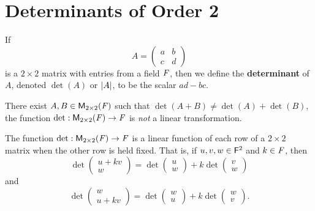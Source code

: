 \section{Determinants of Order \textrm{2}}\label{sec:4.1}

\begin{defn}\label{4.1.1}
  If
  \[
    A = \begin{pmatrix}
      a & b \\
      c & d
    \end{pmatrix}
  \]
  is a \(2 \times 2\) matrix with entries from a field \(\mathit{F}\), then we define the \textbf{determinant} of \(A\), denoted \(\det(A)\) or \(\left\lvert A\right\rvert\), to be the scalar \(ad - bc\).
\end{defn}

\begin{note}
  There exist \(A, B \in \ms[2][2][\F]\) such that \(\det(A + B) \neq \det(A) + \det(B)\), the function \(\det : \ms[2][2][\F] \to \F\) is \emph{not} a linear transformation.
\end{note}

\begin{thm}\label{4.1}
  The function \(\det : \ms[2][2][\F] \to \F\) is a linear function of each row of a \(2 \times 2\) matrix when the other row is held fixed.
  That is, if \(u, v, w \in \mathsf{F}^2\) and \(k \in \mathit{F}\), then
  \[
    \det\begin{pmatrix}
      u + kv \\
      w
    \end{pmatrix} = \det\begin{pmatrix}
      u \\
      w
    \end{pmatrix} + k \det\begin{pmatrix}
      v \\
      w
    \end{pmatrix}
  \]
  and
  \[
    \det\begin{pmatrix}
      w \\
      u + kv
    \end{pmatrix} = \det\begin{pmatrix}
      w \\
      u
    \end{pmatrix} + k \det\begin{pmatrix}
      w \\
      v
    \end{pmatrix}.
  \]
\end{thm}

